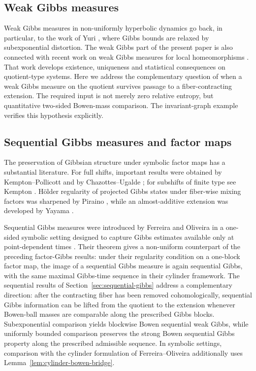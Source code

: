 \documentclass[11pt,a4paper]{article}
\begin{document}
\subsection{Weak Gibbs measures}

Weak Gibbs measures in non-uniformly hyperbolic dynamics go back, in
particular, to the work of Yuri \cite{Yuri1999,Yuri2000}, where Gibbs bounds are
relaxed by subexponential distortion. The weak Gibbs part of the present paper
is also connected with recent work on weak Gibbs measures for local
homeomorphisms \cite{FerreiraRamos}. That work develops existence, uniqueness
and statistical consequences on quotient-type systems. Here we address the
complementary question of when a weak Gibbs measure on the quotient survives
passage to a fiber-contracting extension. The required
input is not merely zero relative entropy, but quantitative two-sided
Bowen-mass comparison. The invariant-graph example verifies this hypothesis
explicitly.

\subsection{Sequential Gibbs measures and factor maps}

The preservation of Gibbsian structure under symbolic factor maps has a
substantial literature. For full shifts, important results were obtained by
Kempton--Pollicott and by Chazottes--Ugalde
\cite{KemptonPollicott,ChazottesUgalde}; for subshifts of finite type see
Kempton \cite{KemptonSFT}. H\"older regularity of projected Gibbs states under
fiber-wise mixing factors was sharpened by Piraino \cite{Piraino}, while an
almost-additive extension was developed by Yayama \cite{YayamaAlmostAdditive}.

Sequential Gibbs measures were introduced by Ferreira and Oliveira in a
one-sided symbolic setting designed to capture Gibbs estimates available only
at point-dependent times \cite{FerreiraOliveira}. Their theorem gives a
non-uniform counterpart of the preceding factor-Gibbs results: under their
regularity condition on a one-block factor map, the image of a sequential
Gibbs measure is again sequential Gibbs, with the same maximal Gibbs-time
sequence in their cylinder framework. The sequential results of
Section~\ref{sec:sequential-gibbs} address a complementary direction: after
the contracting fiber has been removed cohomologically, sequential Gibbs
information can be lifted from the quotient to the extension whenever
Bowen-ball masses are comparable along the prescribed Gibbs blocks.  Subexponential comparison yields blockwise Bowen sequential weak Gibbs,
while uniformly bounded comparison preserves the strong Bowen sequential
Gibbs property along the prescribed admissible sequence. In symbolic settings,
comparison with the cylinder formulation of Ferreira--Oliveira additionally
uses Lemma~\ref{lem:cylinder-bowen-bridge}.
\end{document}

